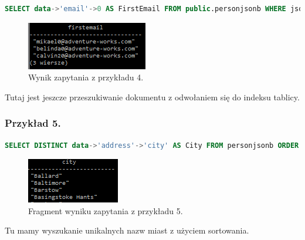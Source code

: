 \documentclass[a4paper,12pt,table]{article}
\begin{document}
{\begin{lstlisting}[language=SQL,basicstyle=\footnotesize]
SELECT data->'email'->0 AS FirstEmail FROM public.personjsonb WHERE jsonb_array_length(data->'email')=1 LIMIT 3;
\end{lstlisting}
\vspace{0.5cm}
\begin{figure}[h]
\begin{center}
\includegraphics[scale=1]{sc/4}

\end{center}
\caption{Wynik zapytania z przykładu 4.}
\end{figure}%
Tutaj jest jeszcze przeszukiwanie dokumentu z odwołaniem się do indeksu tablicy.
\subsubsection*{Przykład 5.}
\begin{lstlisting}[language=SQL,basicstyle=\footnotesize]
SELECT DISTINCT data->'address'->'city' AS City FROM personjsonb ORDER BY City ASC;
\end{lstlisting}
\vspace{0.5cm}
\begin{figure}[h]
\begin{center}
\includegraphics[scale=1]{sc/5}
\end{center}
\caption{Fragment wyniku zapytania z przykładu 5.}

\end{figure}%
Tu mamy wyszukanie unikalnych nazw miast z użyciem sortowania.\newline



}
\end{document}
